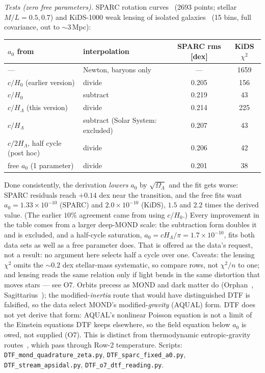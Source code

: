 \documentclass[11pt]{article}
\begin{document}
\emph{Tests (zero free parameters).} SPARC rotation curves~\cite{Lelli2016} (2693 points; stellar $M/L=0.5,0.7$) and
KiDS-1000 weak lensing of isolated galaxies~\cite{Brouwer2021} (15 bins, full covariance, out to $\sim3$\,Mpc):
\begin{center}\small
\begin{tabular}{@{}llcc@{}}
\toprule
$a_0$ from & interpolation & SPARC rms [dex] & KiDS $\chi^2$\\\midrule
--- & Newton, baryons only & --- & 1659\\
$c/H_0$ (earlier version) & divide & 0.205 & 156\\
$c/H_0$ & subtract & 0.219 & 43\\
$c/H_\Lambda$ (this version) & divide & 0.214 & 225\\
$c/H_\Lambda$ & subtract (Solar System: excluded) & 0.207 & 43\\
\midrule
$c/2H_\Lambda$, half cycle (post hoc) & divide & 0.206 & 42\\
free $a_0$ (1 parameter) & divide & 0.201 & 38\\
\bottomrule
\end{tabular}
\end{center}
Done consistently, the derivation \emph{lowers} $a_0$ by $\sqrt{\Omega_\Lambda}$ and the fit gets worse: SPARC residuals
reach $+0.14$ dex near the transition, and the free fits want $a_0=1.33\times10^{-10}$ (SPARC) and $2.0\times10^{-10}$
(KiDS), $1.5$ and $2.2$ times the derived value. (The earlier $10\%$ agreement came from using $c/H_0$.) Every
improvement in the table comes from a larger deep-MOND scale: the subtraction form doubles it and is excluded,
and a half-cycle saturation, $a_0=cH_\Lambda/\pi=1.7\times10^{-10}$, fits both data sets as well as a free parameter does.
That is offered as the data's request, not a result: no argument here selects half a cycle over one. Caveats: the lensing $\chi^2$ omits the $\sim0.2$ dex stellar-mass systematic, so compare rows, not
$\chi^2/n$ to one; and lensing reads the same relation only if light bends in the same distortion that moves
stars --- see O7. Orbits precess as MOND and dark matter do (Orphan~\cite{Koposov2019},
Sagittarius~\cite{Vasiliev2021}); the modified-\emph{inertia} route that would have distinguished DTF is
falsified, so the data select MOND's modified-\emph{gravity} (AQUAL) form. DTF does not yet derive
that form: AQUAL's nonlinear Poisson equation is not a limit of the Einstein equations DTF keeps elsewhere, so
the field equation below $a_0$ is owed, not supplied (O7). This is distinct from
thermodynamic entropic-gravity routes~\cite{Jacobson1995,Verlinde2011}, which pass through Row-2 temperature.
Scripts: \texttt{DTF\_mond\_quadrature\_zeta.py}, \texttt{DTF\_sparc\_fixed\_a0.py},
\texttt{DTF\_stream\_apsidal.py}, \texttt{DTF\_o7\_dtf\_reading.py}.
\end{document}
